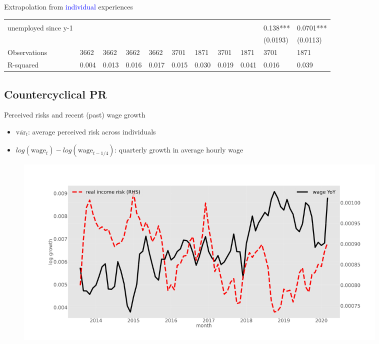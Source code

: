 \documentclass{beamer}
\begin{document}
\begin{frame}{Extrapolation from \textcolor{blue}{individual} experiences}
\begin{table}
{\begin{tabular}{lllllllllll}
				&           &           &           &           &            &            &            &            &            &            \\
				unemployed since y-1&           &           &           &           &            &            &            &            & 0.138***   & 0.0701***  \\
				&           &           &           &           &            &            &            &            & (0.0193)   & (0.0113)   \\
				Observations                          & 3662      & 3662      & 3662      & 3662      & 3701       & 1871       & 3701       & 1871       & 3701       & 1871       \\
				R-squared                             & 0.004     & 0.013     & 0.016     & 0.017     & 0.015      & 0.030      & 0.019      & 0.041      & 0.016      & 0.039      \\
				\hline 
			\end{tabular}
		}
	\end{table}
\end{frame}


\subsection{Countercyclical PR}


\begin{frame}{Perceived risks and recent (past) wage growth}
\label{tsMean3mvrvar_he}
	\begin{itemize}
		\item $\overline{\text{var}_{t}} $: average perceived risk across individuals
		\item  $log(\text{wage}_t) - log(\text{wage}_{t-1/4})$: quarterly growth in average hourly wage
	\end{itemize}
	\begin{figure}
		\centering
		\label{ts_var}
		\includegraphics[width=0.9\textwidth]{figures/tsMean3mvrvar_he.jpg}
	\end{figure}
	\quad  \hyperlink{appendix:tsMean3mvrexp_he}{} 
		\quad  \hyperlink{appendix:PR_macro_labor_market_correlation}{} 
			\quad  \hyperlink{appendix:PR_state_labor_market}{}  
\end{frame}
\end{document}

